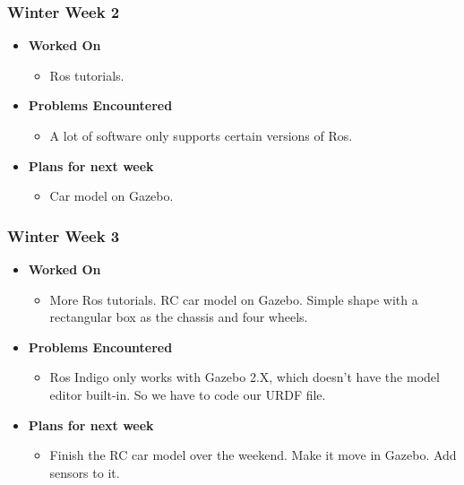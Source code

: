 \documentclass{article}
\begin{document}
\subsubsection{Winter Week 2}
\begin{itemize}
    \item {\textbf{Worked On}}
    \begin{itemize}
      \item Ros tutorials.
    \end{itemize}

    \item {\textbf{Problems Encountered}}
    \begin{itemize}
      \item A lot of software only supports certain versions of Ros.
    \end{itemize}

    \item{\textbf{Plans for next week}}
    \begin{itemize}
      \item Car model on Gazebo.
    \end{itemize}

\end{itemize}

\subsubsection{Winter Week 3}
\begin{itemize}
    \item {\textbf{Worked On}}
    \begin{itemize}
      \item More Ros tutorials. RC car model on Gazebo. Simple shape with a
      rectangular box as the chassis and four wheels.
    \end{itemize}

    \item {\textbf{Problems Encountered}}
    \begin{itemize}
      \item Ros Indigo only works with Gazebo 2.X, which doesn't have the
      model editor built-in. So we have to code our URDF file.
    \end{itemize}

    \item{\textbf{Plans for next week}}
    \begin{itemize}
      \item Finish the RC car model over the weekend. Make it move in
      Gazebo. Add sensors to it.
    \end{itemize}

\end{itemize}
\end{document}
